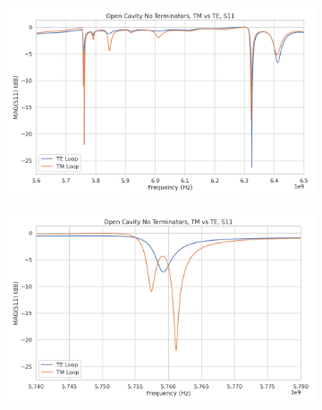 \begin{figure}[htbp]
    \centering
    \begin{subfigure}{0.67\textwidth}
        \includegraphics*[width=\textwidth]{figs/Chapter-6/210922_open_cavity_no_term_TM_vs_TE.png}
        \caption{}
    \end{subfigure}
    \hfill
    \begin{subfigure}{0.67\textwidth}
        \includegraphics*[width=\textwidth]{figs/Chapter-6/210922_open_cavity_no_term_TM_vs_TE_zoom.png}
        \caption{}
    \end{subfigure}
    \caption{}
\end{figure}

